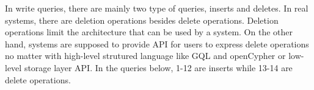 In write queries, there are mainly two type of queries, inserts and deletes.
In real systems, there are deletion operations besides delete operations.
Deletion operations limit the architecture that can be used by a system. On
the other hand, systems are supposed to provide API for users to express
delete operations no matter with high-level strutured language like GQL and
openCypher or low-level storage layer API. In the queries below, 1-12 are
inserts while 13-14 are delete operations.













